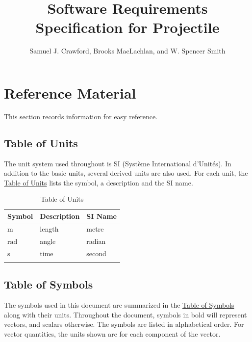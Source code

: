 \documentclass[12pt]{article}
\title{Software Requirements Specification for Projectile}
\author{Samuel J. Crawford, Brooks MacLachlan, and W. Spencer Smith}
\begin{document}
\maketitle
\tableofcontents
\newpage
\section{Reference Material}
\label{Sec:RefMat}
This section records information for easy reference.

\subsection{Table of Units}
\label{Sec:ToU}
The unit system used throughout is SI (Système International d'Unités). In addition to the basic units, several derived units are also used. For each unit, the \hyperref[Table:ToU]{Table of Units} lists the symbol, a description and the SI name.

\begin{longtable}{l l l}
\toprule
\textbf{Symbol} & \textbf{Description} & \textbf{SI Name}
\\
\midrule
\endhead
${\text{m}}$ & length & metre
\\
${\text{rad}}$ & angle & radian
\\
${\text{s}}$ & time & second
\\
\bottomrule
\caption{Table of Units}
\label{Table:ToU}
\end{longtable}
\subsection{Table of Symbols}
\label{Sec:ToS}
The symbols used in this document are summarized in the \hyperref[Table:ToS]{Table of Symbols} along with their units. Throughout the document, symbols in bold will represent vectors, and scalars otherwise. The symbols are listed in alphabetical order. For vector quantities, the units shown are for each component of the vector.
\end{document}
